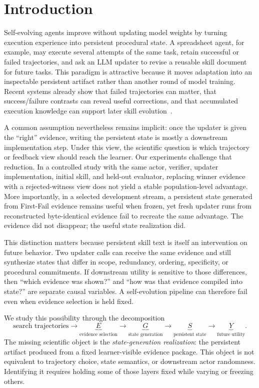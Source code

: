\section{Introduction}

Self-evolving agents improve without updating model weights by turning execution experience into persistent procedural state. A spreadsheet agent, for example, may execute several attempts of the same task, retain successful or failed trajectories, and ask an LLM updater to revise a reusable skill document for future tasks. This paradigm is attractive because it moves adaptation into an inspectable persistent artifact rather than another round of model training. Recent systems already show that failed trajectories can matter, that success/failure contrasts can reveal useful corrections, and that accumulated execution knowledge can support later skill evolution~\citep{liu2026rethinkskill,chen2026skillcat,liu2026skillrevise,tang2026wikiskill}.

A common assumption nevertheless remains implicit: once the updater is given the ``right'' evidence, writing the persistent state is mostly a downstream implementation step. Under this view, the scientific question is which trajectory or feedback view should reach the learner. Our experiments challenge that reduction. In a controlled study with the same actor, verifier, updater implementation, initial skill, and held-out evaluator, replacing winner evidence with a rejected-witness view does not yield a stable population-level advantage. More importantly, in a selected development stream, a persistent state generated from First-Fail evidence remains useful when frozen, yet fresh updater runs from reconstructed byte-identical evidence fail to recreate the same advantage. The evidence did not disappear; the useful state realization did.

This distinction matters because persistent skill text is itself an intervention on future behavior. Two updater calls can receive the same evidence and still synthesize states that differ in scope, redundancy, ordering, specificity, or procedural commitments. If downstream utility is sensitive to those differences, then ``which evidence was shown?'' and ``how was that evidence compiled into state?'' are separate causal variables. A self-evolution pipeline can therefore fail even when evidence selection is held fixed.

We study this possibility through the decomposition
\begin{equation}
\text{search trajectories}
\rightarrow
\underbrace{E}_{\text{evidence selection}}
\rightarrow
\underbrace{G}_{\text{state generation}}
\rightarrow
\underbrace{S}_{\text{persistent state}}
\rightarrow
\underbrace{Y}_{\text{future utility}}.
\end{equation}
The missing scientific object is the \emph{state-generation realization}: the persistent artifact produced from a fixed learner-visible evidence package. This object is not equivalent to trajectory choice, state semantics, or downstream actor randomness. Identifying it requires holding some of those layers fixed while varying or freezing others.


